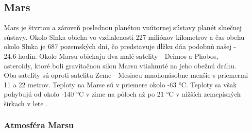 \subsection{Mars}
Mars je štvrtou a zároveň poslednou planétou vnútornej sústavy planét slnečnej sústavy. Okolo Slnka obieha vo vzdialenosti 227 miliónov kilometrov a čas obehu okolo Slnka je 687 pozemských dní, čo predstavuje dĺžku dňa podobnú našej - 24.6 hodín. Okolo Marsu obiehaju dva malé satelity - Deimos a Phobos, asteroidy, ktoré boli gravitačnou silou Marsu vtiahnuté na jeho obežnú dráhu. Oba satelity sú oproti satelitu Zeme - Mesiacu mnohonásobne menšie s priemermi 11 a 22 metrov. Teploty na Marse sú v priemere okolo -63 °C. Teploty sa však pohybujú od okolo -140 °C v zime na póloch až po 21 °C v nižších zemepisných šírkach v lete \cite{pocasie_mars}.

\subsubsection{Atmosféra Marsu}
\label{atmosferaMarsu}

